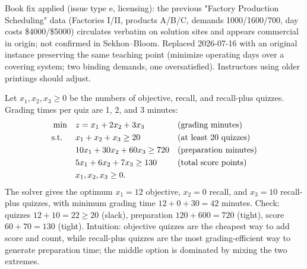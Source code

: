 \begin{qaflag}
Book fix applied (issue type e, licensing): the previous "Factory Production Scheduling" data (Factories I/II, products A/B/C, demands 1000/1600/700, day costs \$4000/\$5000) circulates verbatim on solution sites and appears commercial in origin; not confirmed in Sekhon--Bloom. Replaced 2026-07-16 with an original instance preserving the same teaching point (minimize operating days over a covering system; two binding demands, one oversatisfied). Instructors using older printings should adjust.
\end{qaflag}


Let $x_1, x_2, x_3 \geq 0$ be the numbers of objective, recall, and recall-plus quizzes. Grading times per quiz are 1, 2, and 3 minutes:
\begin{align*}
\min \quad & z = x_1 + 2x_2 + 3x_3 && \text{(grading minutes)}\\
\text{s.t.}\;\; \quad & x_1 + x_2 + x_3 \geq 20 && \text{(at least 20 quizzes)}\\
& 10x_1 + 30x_2 + 60x_3 \geq 720 && \text{(preparation minutes)}\\
& 5x_1 + 6x_2 + 7x_3 \geq 130 && \text{(total score points)}\\
& x_1, x_2, x_3 \geq 0.
\end{align*}
The solver gives the optimum $x_1 = 12$ objective, $x_2 = 0$ recall, and $x_3 = 10$ recall-plus quizzes, with minimum grading time $12 + 0 + 30 = 42$ minutes. Check: quizzes $12 + 10 = 22 \geq 20$ (slack), preparation $120 + 600 = 720$ (tight), score $60 + 70 = 130$ (tight). Intuition: objective quizzes are the cheapest way to add score and count, while recall-plus quizzes are the most grading-efficient way to generate preparation time; the middle option is dominated by mixing the two extremes.


